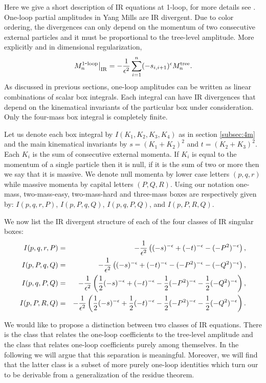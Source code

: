\documentclass[12pt]{article}
\newcommand{\be}{\begin{eqnarray}}
\newcommand{\ee}{\end{eqnarray}}
\begin{document}
Here we give a short description of IR equations at 1-loop, for more
details see \cite{IReq, catani}. One-loop partial amplitudes in Yang
Mills are IR divergent. Due to color ordering, the divergences can
only depend on the momentum of two consecutive external particles
and it must be proportional to the tree-level amplitude. More
explicitly and in dimensional regularization,
%
\be
\left. M^{\rm 1 \hbox{-} loop}_n\right|_{\rm IR}  = -\frac{1}{\epsilon^2}\sum_{i=1}^n (-s_{i,i+1})^{\epsilon} M^{\rm tree}_n.
\ee
%
As discussed in previous sections, one-loop amplitudes can be written as linear combinations of scalar box integrals. Each integral can have IR divergences that depend on the kinematical invariants of the particular box under consideration. Only the four-mass box integral is completely finite.

Let us denote each box integral by $I(K_1,K_2,K_3,K_4)$ as in section \ref{subsec:4m} and the main kinematical invariants by $s=(K_1+K_2)^2$ and $t=(K_2+K_3)^2$. Each $K_i$ is the sum of consecutive external momenta. If $K_i$ is equal to the momentum of a single particle then it is null, if it is the sum of two or more then we say that it is massive. We denote null momenta by lower case letters $(p,q,r)$ while massive momenta by capital letters $(P,Q,R)$. Using our notation one-mass, two-mass-easy, two-mass-hard and three-mass boxes are respectively given by: $I(p,q,r,P)$, $I(p,P,q,Q)$, $I(p,q,P,Q)$, and $I(p,P,R,Q)$.

We now list the IR divergent structure of each of the four classes of IR singular boxes:
%
\begin{eqnarray}
\label{rhs}
I(p,q,r,P) & = & -\frac{1}{\epsilon^2}\left( (-s)^{-\epsilon} + (-t)^{-\epsilon} - (-P^2)^{-\epsilon} \right), \cr
I(p,P,q,Q) & = & -\frac{1}{\epsilon^2}\left( (-s)^{-\epsilon} + (-t)^{-\epsilon} - (-P^2)^{-\epsilon} - (-Q^2)^{-\epsilon}\right), \cr
I(p,q,P,Q) & = & -\frac{1}{\epsilon^2}\left( \frac{1}{2}(-s)^{-\epsilon}+(-t)^{-\epsilon}-\frac{1}{2}(-P^2)^{-\epsilon}-\frac{1}{2}(-Q^2)^{-\epsilon}\right),\cr
I(p,P,R,Q) & = &  -\frac{1}{\epsilon^2}\left( \frac{1}{2}(-s)^{-\epsilon} + \frac{1}{2}(-t)^{-\epsilon} - \frac{1}{2}(-P^2)^{-\epsilon} - \frac{1}{2}(-Q^2)^{-\epsilon}\right).
\end{eqnarray}
%

We would like to propose a distinction between two classes of IR equations. There is the class that relates the one-loop coefficients to the tree-level amplitude and the class that relates one-loop coefficients purely among themselves. In the following we will argue that this separation is meaningful. Moreover, we will find that the latter class is a subset of more purely one-loop identities which turn our to be derivable from a generalization of the residue theorem.
\end{document}

